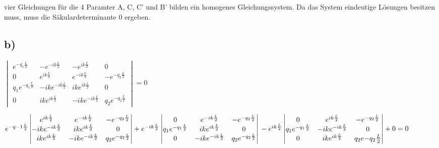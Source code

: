     \justifying vier Gleichungen für die 4 Paramter A, C, C' und B' bilden ein
    homogenes Gleichungssystem. Da das System eindeutige Lösungen besitzen muss,
    muss die Säkulardeterminante 0 ergeben.
    \subsection{b)}
$
    \begin{vmatrix}
        e^{-q_1 \frac{L}{2}} & -e^{-ik \frac{L}{2}} & -e^{ik\frac{L}{2}} & 0\\
        0 & e^{ik \frac{L}{2}} & e^{-ik\frac{L}{2}}  & -e^{-q_2 \frac{L}{2}}   \\
        q_1 e^{-q_1 \frac{L}{2}} & -ik e^{-ik \frac{L}{2}} & ik e^{ik \frac{L}{2}} & 0  \\
        0 & ik e^{ik \frac{L}{2}} & -ik e^{-ik \frac{L}{2}} & q_2 e^{-q_2 \frac{L}{2}}  
    \end{vmatrix}
    =0
$

$
e^{-q-1 \frac{L}{2}}
\begin{vmatrix}
  e^{ik \frac{L}{2}}  & e^{-ik \frac{L}{2}} & - e^{-q_2 \frac{L}{2}}\\
  -ik e^{-ik\frac{L}{2}}  & ik e^{ik\frac{L}{2}} & 0\\
  ik e^{ik\frac{L}{2}}  & -ik e^{-ik \frac{L}{2}}  & q_2 e^{- q_2 \frac{L}{2}}
\end{vmatrix}
+ e^{-ik\frac{L}{2}}
\begin{vmatrix}
 0  & e^{-ik \frac{L}{2}} & - e^{-q_2 \frac{L}{2}}\\
  q_1 e^{-q_1 \frac{L}{2}} & ik e^{ik \frac{L}{2}} & 0 \\
 0  & -ik e^{-ik \frac{L}{2}} & q_2 e^{-q_2 \frac{L}{2}} 
\end{vmatrix}\\
-e^{ik\frac{L}{2}}
\begin{vmatrix}
 0  &  e^{ik \frac{L}{2}} & -e^{-q_2 \frac{L}{2}} \\   
 q_1 e^{-q_1 \frac{L}{2}}  & -ik e^{-ik \frac{L}{2}}  & 0   \\
 0  &  ik e^{ik \frac{L}{2}} & q_2 e{-q_2 \frac{L}{2}}   
\end{vmatrix}
+0 = 0 
$

